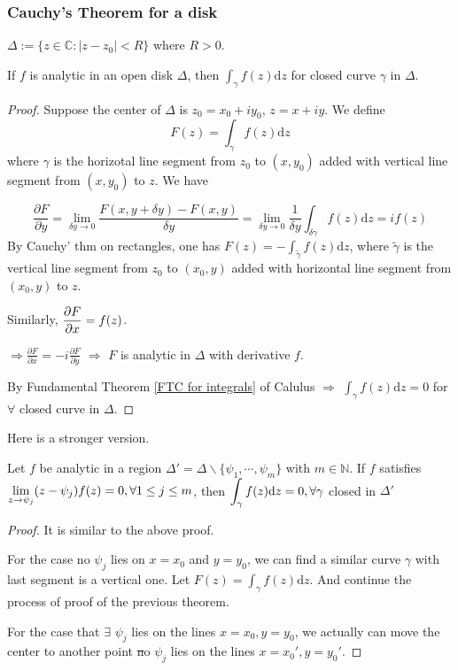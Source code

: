  \subsubsection{Cauchy's Theorem for a disk}
  $ \Delta:=\{z\in \mathbb{C}:|z-z_0|<R\} $ where  $ R>0 $.
  \begin{theorem}\label{Cauchy's theorem for a disk}
    If  $ f $ is analytic in an open disk  $ \Delta $, then  $ \int_\gamma f(z)\mathrm{d}z $  for closed curve  $ \gamma $ in  $ \Delta $.  
  \end{theorem}  
  \begin{proof}
    Suppose the center of  $ \Delta $ is  $ z_0=x_0+iy_0 $,  $ z=x+iy $. We define 
    \[F(z)=\int_\gamma f(z)\mathrm{d}z\]
    where  $ \gamma $ is the horizotal line segment from  $ z_0 $ to  $ (x,y_0) $ added with vertical line segment from  $ (x,y_0) $ to  $ z $. We have
    
    \begin{equation}
        \frac{\partial F}{\partial y}=\lim_{\delta y\to 0}\frac{F(x,y+\delta y)-F(x,y)}{\delta y}=\lim_{\delta y\to 0}\frac{1}{\delta y}\int_{\delta\gamma}f(z)\mathrm{d}z=if(z)
    \end{equation}
    By Cauchy' thm on rectangles, one has  $ F(z)=-\int_{\tilde{\gamma}}f(z)\mathrm{d}z $, where  $ \tilde{\gamma} $ is the vertical line segment from  $ z_0 $ to  $ (x_0,y) $ added with horizontal line segment from  $ (x_0,y) $ to  $ z $.
    
    Similarly,  $ \displaystyle\frac{\partial F}{\partial x}=f(z) $.
    
     $ \Rightarrow \frac{\partial F}{\partial x}=-i\frac{\partial F}{\partial y} $ $ \Rightarrow  $ $ F  $   is analytic in  $ \Delta $  with derivative  $ f $.
     
     By Fundamental Theorem \ref{FTC for integrals} of Calulus $ \Rightarrow  $  $ \int_\gamma f(z)\mathrm{d}z=0 $ for  $ \forall  $ closed curve in  $ \Delta $.    
  \end{proof}
  Here is a stronger version.
  \begin{theorem}\label{stronger version of Cauchy's theorem for a disk}
    Let  $ f $ be analytic in a region  $ \Delta'=\Delta\backslash\{\psi_1,\cdots,\psi_m\} $ with  $ m\in \mathbb{N} $. If  $ f $ satisfies  $ \displaystyle\lim\limits_{z\to \psi_j}(z-\psi_j)f(z)=0,\forall 1\leq j\leq m $, then  $ \displaystyle\int_\gamma f(z)\mathrm{d}z=0,\forall \gamma $ closed in  $ \Delta'  $     
  \end{theorem}
  \begin{proof}
    It is similar to the above proof.
    
    For the case no  $ \psi_j $ lies on  $ x=x_0 $ and  $ y=y_0 $, we can find a similar curve $ \gamma $ with last segment is a vertical one. Let  $ F(z)=\int_\gamma f(z)\mathrm{d}z $. And continue the process of proof of the previous theorem.  
    
    For the case that  $ \exists $  $ \psi_j $ lies on the lines  $ x=x_0,y=y_0 $, we actually can move the center to another point \st no  $ \psi_j $ lies on the lines  $ x=x_0',y=y_0'$.   
  \end{proof}
